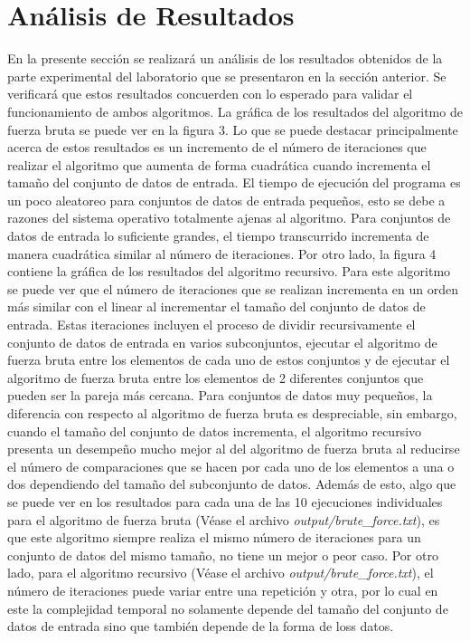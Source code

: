 \section{Análisis de Resultados}

En la presente sección se realizará un análisis de los resultados obtenidos de la parte experimental del laboratorio que se presentaron en la sección anterior. Se verificará que estos resultados concuerden con lo esperado para validar el funcionamiento de ambos algoritmos. La gráfica de los resultados del algoritmo de fuerza bruta se puede ver en la figura 3. Lo que se puede destacar principalmente acerca de estos resultados es un incremento de el número de iteraciones que realizar el algoritmo que aumenta de forma cuadrática cuando incrementa el tamaño del conjunto de datos de entrada. El tiempo de ejecución del programa es un poco aleatoreo para conjuntos de datos de entrada pequeños, esto se debe a razones del sistema operativo totalmente ajenas al algoritmo. Para conjuntos de datos de entrada lo suficiente grandes, el tiempo transcurrido incrementa de manera cuadrática similar al número de iteraciones. Por otro lado, la figura 4 contiene la gráfica de los resultados del algoritmo recursivo. Para este algoritmo se puede ver que el número de iteraciones que se realizan incrementa en un orden más similar con el linear al incrementar el tamaño del conjunto de datos de entrada. Estas iteraciones incluyen el proceso de dividir recursivamente el conjunto de datos de entrada en varios subconjuntos, ejecutar el algoritmo de fuerza bruta entre los elementos de cada uno de estos conjuntos y de ejecutar el algoritmo de fuerza bruta entre los elementos de 2 diferentes conjuntos que pueden ser la pareja más cercana. Para conjuntos de datos muy pequeños, la diferencia con respecto al algoritmo de fuerza bruta es despreciable, sin embargo, cuando el tamaño del conjunto de datos incrementa, el algoritmo recursivo presenta un desempeño mucho mejor al del algoritmo de fuerza bruta al reducirse el número de comparaciones que se hacen por cada uno de los elementos a una o dos dependiendo del tamaño del subconjunto de datos. Además de esto, algo que se puede ver en los resultados para cada una de las 10 ejecuciones individuales para el algoritmo de fuerza bruta (Véase el archivo \textit{output/brute\_force.txt}), es que este algoritmo siempre realiza el mismo número de iteraciones para un conjunto de datos del mismo tamaño, no tiene un mejor o peor caso. Por otro lado, para el algoritmo recursivo (Véase el archivo \textit{output/brute\_force.txt}), el número de iteraciones puede variar entre una repetición y otra, por lo cual en este la complejidad temporal no solamente depende del tamaño del conjunto de datos de entrada sino que también depende de la forma de loss datos.